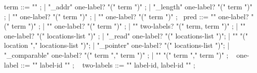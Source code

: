 \begin{syntax}
  term ::= "\null" ;
        | "\base_addr" { one-label? } "(" term ")" ;
        | "\block_length" { one-label? } "(" term ")" ;
        | "\offset" { one-label? } "(" term ")" ;
        | { "\allocation" one-label? "(" term ")" };
       \
  pred ::= { "\allocable" one-label? "(" term ")" };
       | "\freeable" { one-label? } "(" term ")" ;
       | { "\fresh" two-labels? "(" term, term ")" };
       | "\valid" { one-label? } "(" locations-list ")" ;
       | "\valid_read" { one-label? } "(" locations-list ")";
       | "\separated" "(" location "," locations-list ")";
       | "\object_pointer" { one-label? } "(" locations-list ")";
       | { "\pointer_comparable" one-label? "(" term "," term ")" };
       | "\aligned" "(" term "," term ")" ;
       \
  { one-label } ::= { "{" label-id "}" } ;
       \
  { two-labels } ::= { "{" label-id, label-id "}" } ;
\end{syntax}
